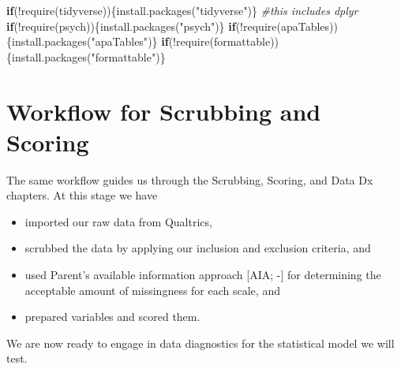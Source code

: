 \documentclass[
  11pt,
]{book}
\newenvironment{Shaded}{\begin{snugshade}}{\end{snugshade}}
\newcommand{\CommentTok}[1]{\textcolor[rgb]{0.56,0.35,0.01}{\textit{#1}}}
\newcommand{\ControlFlowTok}[1]{\textcolor[rgb]{0.13,0.29,0.53}{\textbf{#1}}}
\newcommand{\FunctionTok}[1]{\textcolor[rgb]{0.00,0.00,0.00}{#1}}
\newcommand{\NormalTok}[1]{#1}
\newcommand{\SpecialCharTok}[1]{\textcolor[rgb]{0.00,0.00,0.00}{#1}}
\newcommand{\StringTok}[1]{\textcolor[rgb]{0.31,0.60,0.02}{#1}}
\providecommand{\tightlist}{%
  \setlength{\itemsep}{0pt}\setlength{\parskip}{0pt}}
\begin{document}
\begin{Shaded}
\begin{Highlighting}[]
\ControlFlowTok{if}\NormalTok{(}\SpecialCharTok{!}\FunctionTok{require}\NormalTok{(tidyverse))\{}\FunctionTok{install.packages}\NormalTok{(}\StringTok{"tidyverse"}\NormalTok{)\} }\CommentTok{\#this includes dplyr}
\ControlFlowTok{if}\NormalTok{(}\SpecialCharTok{!}\FunctionTok{require}\NormalTok{(psych))\{}\FunctionTok{install.packages}\NormalTok{(}\StringTok{"psych"}\NormalTok{)\}}
\ControlFlowTok{if}\NormalTok{(}\SpecialCharTok{!}\FunctionTok{require}\NormalTok{(apaTables))\{}\FunctionTok{install.packages}\NormalTok{(}\StringTok{"apaTables"}\NormalTok{)\}}
\ControlFlowTok{if}\NormalTok{(}\SpecialCharTok{!}\FunctionTok{require}\NormalTok{(formattable))\{}\FunctionTok{install.packages}\NormalTok{(}\StringTok{"formattable"}\NormalTok{)\}}
\end{Highlighting}
\end{Shaded}

\hypertarget{workflow-for-scrubbing-and-scoring-2}{%
\section{Workflow for Scrubbing and Scoring}\label{workflow-for-scrubbing-and-scoring-2}}

The same workflow guides us through the Scrubbing, Scoring, and Data Dx chapters. At this stage we have

\begin{itemize}
\tightlist
\item
  imported our raw data from Qualtrics,
\item
  scrubbed the data by applying our inclusion and exclusion criteria, and
\item
  used Parent's available information approach {[}AIA; -\citet{parent_handling_2013}{]} for determining the acceptable amount of missingness for each scale, and
\item
  prepared variables and scored them.
\end{itemize}

We are now ready to engage in data diagnostics for the statistical model we will test.
\end{document}
